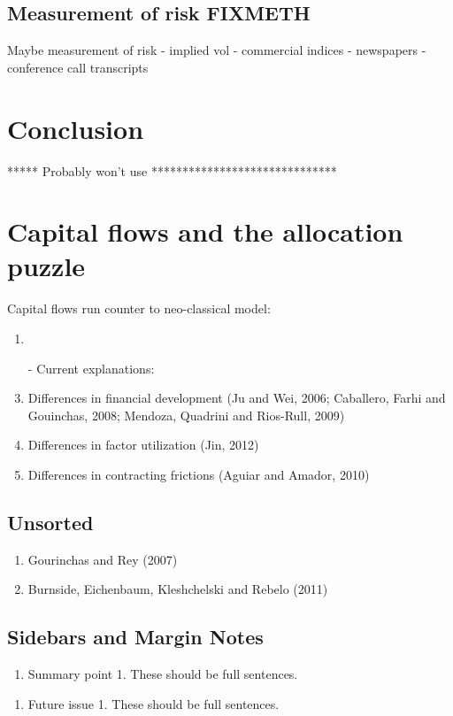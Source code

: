 \documentclass{ar-1col}
\begin{document}
\subsection{Measurement of risk FIXMETH}
Maybe measurement of risk - implied vol - commercial indices - newspapers - conference call transcripts


\section{Conclusion}


***** Probably won't use ******************************


\section*{Capital flows and the allocation puzzle}
Capital flows run counter to neo-classical model:
\begin{enumerate}
\item \citet{GourinchasJeanne2013}
\item[-] Current explanations:
\item Differences in financial development (Ju and Wei, 2006;
  Caballero, Farhi and Gouinchas, 2008; Mendoza, Quadrini and
  Rios-Rull, 2009)
\item Differences in factor utilization (Jin, 2012)
\item Differences in contracting frictions (Aguiar and Amador, 2010)
\end{enumerate}


\subsection{Unsorted}
\begin{enumerate}
\item Gourinchas and Rey (2007)
\item Burnside, Eichenbaum, Kleshchelski and Rebelo (2011)
\end{enumerate}



\subsection{Sidebars and Margin Notes}
\begin{marginnote}[]
    
\end{marginnote}


\begin{summary}
  \begin{enumerate}
  \item Summary point 1. These should be full sentences.

  \end{enumerate}
\end{summary}

\begin{issues}
  \begin{enumerate}
  \item Future issue 1. These should be full sentences.
  \end{enumerate}
\end{issues}

\newpage


 

\clearpage



    
\end{document}
